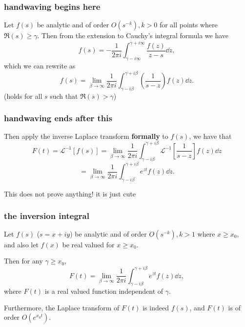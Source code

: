 \documentclass[mathserif]{beamer}
\newcommand{\br}[1]{\left(#1\right)}
\newcommand{\sbr}[1]{\left[#1\right]}
\begin{document}
\begin{frame}
  \frametitle{handwaving begins here}

  Let $f(s)$ be analytic and of order $O(s^{-k}), k> 0$ for all points where $\Re(s)\geq \gamma$. Then from the extension to Cauchy's integral formula we have \[f(s) = -\frac{1}{2\pi i}\int_{\gamma-i\infty}^{\gamma+i\infty}\frac{f(z)}{z-s}\dd{z}, \] which we can rewrite as \[f(s) = \lim_{\beta\to \infty}\frac{1}{2\pi i}\int_{\gamma-i\beta}^{\gamma+i\beta}\br{\frac{1}{s-z}}f(z)\dd{z}.\] (holds for all $s$ such that $\Re(s) > \gamma$)

\end{frame}

\begin{frame}
  \frametitle{handwaving ends after this}

  Then apply the inverse Laplace transform \textbf{formally} to $f(s)$, we have that \[F(t) = \mathcal{L}^{-1}\sbr{f(s)} = \lim_{\beta\to \infty}\frac{1}{2\pi i}\int_{\gamma-i\beta}^{\gamma+i\beta} \mathcal{L}^{-1}\sbr{\frac{1}{s-z}}f(z)\dd{z}\] \[ = \lim_{\beta\to \infty}\frac{1}{2\pi i}\int_{\gamma-i\beta}^{\gamma+i\beta}e^{zt}f(z)\dd{z}.\]

  This does not prove anything! it is just cute

\end{frame}

\begin{frame}
  \frametitle{the inversion integral}


  \begin{theorem}
    Let $f(s)$ ($s = x+iy$) be analytic and of order $O(s^{-k}), k > 1$ where $x \geq x_0$, and also let $f(x)$ be real valued for $x\geq x_0$.
    
    Then for any $\gamma \geq x_0$, \[F(t) = \lim_{\beta \to \infty}\frac{1}{2\pi i}\int_{\gamma - i\beta}^{\gamma + i\beta}e^{zt}f(z)\dd{z},\] where $F(t)$ is a real valued function independent of $\gamma$.

    Furthermore, the Laplace transform of $F(t)$ is indeed $f(s)$, and $F(t)$ is of order $O(e^{x_0t})$.
  \end{theorem}


\end{frame}
\end{document}
